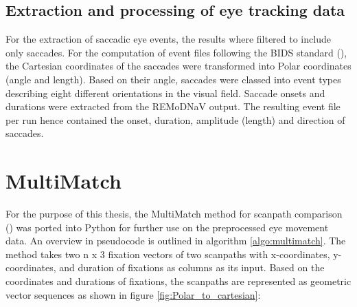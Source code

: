 \documentclass[a4paper, 12pt]{scrreprt}
\begin{document}
\subsection{Extraction and processing of eye tracking data}

For the extraction of saccadic eye events, the results where filtered to include only saccades. For the computation of event files following the BIDS standard (\cite{gorgolewski2016brain}), the Cartesian coordinates of the saccades were transformed into Polar coordinates (angle and length). Based on their angle, saccades were classed into event types describing eight different orientations in the visual field. Saccade onsets and durations were extracted from the REMoDNaV output. The resulting event file per run hence contained the onset, duration, amplitude (length) and direction of saccades. \newline


\section{MultiMatch}\label{section:multimatch}
For the purpose of this thesis, the MultiMatch method for scanpath comparison (\cite{jarodzka2010vector}) was ported into Python for further use on the preprocessed eye movement data. An overview in pseudocode is outlined in algorithm \ref{algo:multimatch}. \newline 
The method takes two n x 3 fixation vectors of two scanpaths with x-coordinates, y-coordinates, and duration of fixations as columns as its input. Based on the coordinates and durations of fixations, the scanpaths are represented as geometric vector sequences as shown in figure \ref{fig:Polar_to_cartesian}:
\end{document}
